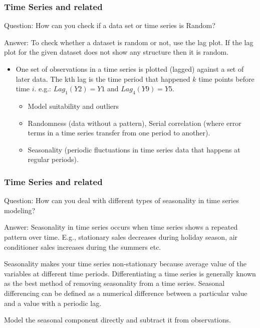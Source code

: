 \documentclass[11pt]{beamer}
\begin{document}
\begin{frame}
\frametitle{Time Series and related}
\begin{block}{Question:}
	How can you check if a data set or time series is Random?
\end{block}
\begin{block}{Answer:}
	To check whether a dataset is random or not, use the lag plot. If the lag plot for the given dataset does not show any structure then it is random.
\end{block}
\begin{itemize}
	\item One set of observations in a time series is plotted (lagged) against a set of later data. The kth lag is the time period that happened $k$ time points before time $i$. e.g.: $Lag_1(Y2) = Y1$ and $Lag_4(Y9) = Y5$.
	\begin{itemize}
		\item Model suitability and outliers
		\item Randomness (data without a pattern), Serial correlation (where error terms in a time series transfer from one period to another).
		\item Seasonality (periodic fluctuations in time series data that happens at regular periods).
	\end{itemize}
\end{itemize}
\end{frame}

\begin{frame}
\frametitle{Time Series and related}
\begin{block}{Question:}
	How can you deal with different types of seasonality in time series modeling?
\end{block}
\begin{block}{Answer:}
	Seasonality in time series occurs when time series shows a repeated pattern over time. E.g., stationary sales decreases during holiday season, air conditioner sales increases during the summers etc.
	
	Seasonality makes your time series non-stationary because average value of the variables at different time periods. Differentiating a time series is generally known as the best method of removing seasonality from a time series. Seasonal differencing can be defined as a numerical difference between a particular value and a value with a periodic lag.
	
	Model the seasonal component directly and subtract it from observations.
\end{block}
\end{frame}
\end{document}
